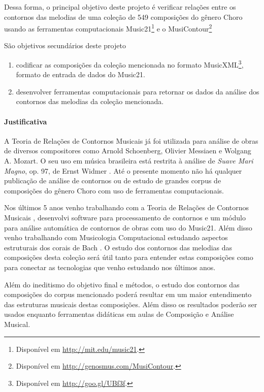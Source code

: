 \documentclass[11pt]{article}
\newcommand{\opus}[1]{\textit{#1}}
\begin{document}
Dessa forma, o principal objetivo deste projeto é verificar relações
entre os contornos das melodias de uma coleção de 549 composições do
gênero Choro usando as ferramentas computacionais
Music21\footnote{Disponível em \url{http://mit.edu/music21}.} e o
MusiContour\footnote{Disponível em
  \url{http://genosmus.com/MusiContour}.}

São objetivos secundários deste projeto
\begin{enumerate}
\item codificar as composições da coleção mencionada no formato
  MusicXML\footnote{Disponível em \url{http://goo.gl/UBf3f}.}, formato
  de entrada de dados do Music21.
\item desenvolver ferramentas computacionais para retornar os dados da
  análise dos contornos das melodias da coleção mencionada.
\end{enumerate}

\paragraph{Justificativa}
\label{sec:justificativa}

A Teoria de Relações de Contornos Musicais já foi utilizada para
análise de obras de diversos compositores como Arnold Schoenberg,
Olivier Messiaen e Wolgang A. Mozart. O seu uso em música brasileira
está restrita à análise de \opus{Suave Mari Magno}, op. 97, de Ernst
Widmer \cite{Thiesen2005}. Até o presente momento não há qualquer
publicação de análise de contornos ou de estudo de grandes corpus de
composições do gênero Choro com uso de ferramentas computacionais.

Nos últimos 5 anos venho trabalhando com a Teoria de Relações de
Contornos Musicais \cite{Sampaio2008}, desenvolvi software para
processamento de contornos e um módulo para análise automática de
contornos de obras com uso do Music21.
Além disso venho trabalhando com Musicologia Computacional estudando
aspectos estruturais dos corais de Bach \cite{Kroger2008}. O estudo
dos contornos das melodias das composições desta coleção será útil
tanto para entender estas composições como para conectar as
tecnologias que venho estudando nos últimos anos.

Além do ineditismo do objetivo final e métodos, o estudo dos contornos
das composições do corpus mencionado poderá resultar em um maior
entendimento das estruturas musicais destas composições. Além disso os
resultados poderão ser usados enquanto ferramentas didáticas em aulas
de Composição e Análise Musical.
\end{document}
